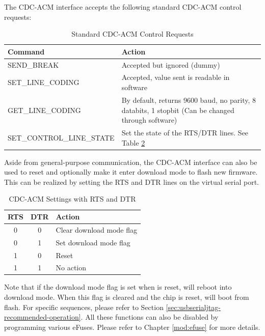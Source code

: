 \documentclass[main\_\_EN.tex]{subfiles}
\begin{document}
The CDC-ACM interface accepts the following standard CDC-ACM control requests:

\begin{table}[H]
    \centering
    \caption{Standard CDC-ACM Control Requests}
    \label{tab:usbserialjtag-standard-cdc-acm-requests}

    \begin{tabular}{ | l | p{10cm} | }
    \hline
        \rowcolor{lightgray}
        \textbf{Command} & \textbf{Action} \\\hline

        SEND\_BREAK & Accepted but ignored (dummy) \\\hline
        SET\_LINE\_CODING & Accepted, value sent is readable in software \\\hline
        GET\_LINE\_CODING & By default, returns 9600 baud, no parity, 8 databits, 1 stopbit (Can be changed through software) \\\hline
        SET\_CONTROL\_LINE\_STATE & Set the state of the RTS/DTR lines. See Table \ref{tab:usbserialjtag-cdc-acm-settings-with-rts-and-dtr} \\\hline
    \end{tabular}
\end{table}

Aside from general-purpose communication, the CDC-ACM interface can also be used to reset \chipname{} and optionally make it enter download mode to flash new firmware. This can be realized by setting the RTS and DTR lines on the virtual serial port.

\begin{table}[H]
    \centering
    \caption{CDC-ACM Settings with RTS and DTR}
    \label{tab:usbserialjtag-cdc-acm-settings-with-rts-and-dtr}

    \begin{tabular}{ | c | c | p{5cm} | }
    \hline
        \rowcolor{lightgray}
        \textbf{RTS} & \textbf{DTR} & \textbf{Action}\\\hline

        0 & 0 & Clear download mode flag  \\\hline
        0 & 1 & Set download mode flag  \\\hline
        1 & 0 & Reset \chipname{}  \\\hline
        1 & 1 & No action \\\hline
    \end{tabular}
\end{table}

Note that if the download mode flag is set when \chipname{} is reset, \chipname{} will reboot into download mode. When this flag is cleared and the chip is reset, \chipname{} will boot from flash. For specific sequences, please refer to Section \ref{sec:usbserialjtag-recommended-operation}. All these functions can also be disabled by programming various eFuses. Please refer to Chapter \ref{mod:efuse} \textit{} for more details.
\end{document}
